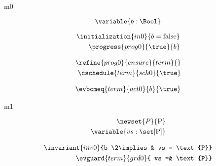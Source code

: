 \documentclass{article}
\begin{document}
	
\begin{machine}{m0}
	
\[
\variable{ b : \Bool }
\]


\begin{align}
\initialization{in0}{b = \false} \\
\progress{prog0}{\true}{b}
\end{align}

\begin{align}
\refine{prog0}{ensure}{term}{} \\
\weakento{term}{default}{sch0} \\
\cschedule{term}{sch0}{\true} 
\end{align}

\begin{align}
\evbcmeq{term}{act0}{b}{\true}
\end{align}


\end{machine}

\newcommand{\Pcs}{\text{P}}

\begin{machine}{m1}

\begin{align*}	
\newset{P}{\Pcs} \\
\variable{ vs : \set[\Pcs] }
\end{align*}

\begin{align}
	\invariant{inv0}{b \2\implies& vs = \Pcs} \\
	\evguard{term}{grd0}{ vs =& \Pcs }
\end{align}

\end{machine}
\end{document}
